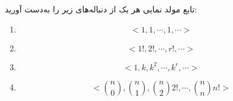     \p 
تابع مولد نمایی هر یک از دنباله‌های زیر را به‌دست آورید:
\begin{enumerate}
\item
$$<1, 1, \cdots, 1, \cdots>$$
\item
$$<1!, 2!, \cdots, r!, \cdots>$$
\item
$$<1, k, k^2, \cdots, k^r, \cdots>$$
\item
$$<\binom{n}{0}, \binom{n}{1}, \binom{n}{2}2!, \cdots, \binom{n}{n}n!>$$
\end{enumerate}